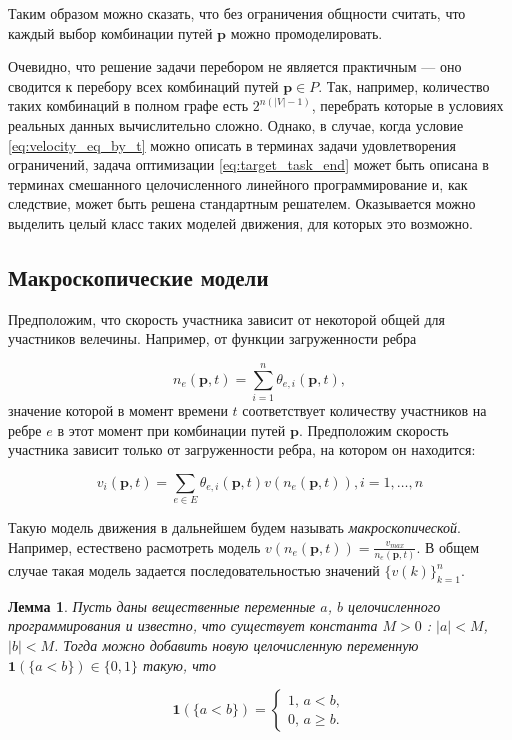 \documentclass[12pt, a4paper]{article}
\newtheorem{lemma}{Лемма}[section]
\begin{document}
Таким образом можно сказать, что без ограничения общности считать, что каждый выбор комбинации путей $\textbf{p}$ можно промоделировать.

Очевидно, что решение задачи перебором не является практичным --- оно сводится к перебору всех комбинаций путей $\textbf{p} \in P$. Так, например, количество таких комбинаций в полном графе есть $2^{n (|V| - 1)}$, перебрать которые в условиях реальных данных вычислительно сложно.
Однако, в случае, когда условие \eqref{eq:velocity_eq_by_t} можно описать в терминах задачи удовлетворения ограничений, задача оптимизации \eqref{eq:target_task_end} может быть описана в терминах смешанного целочисленного линейного программирование и, как следствие, может быть решена стандартным решателем. Оказывается можно выделить целый класс таких моделей движения, для которых это возможно.

\subsection{Макроскопические модели}

Предположим, что скорость участника зависит от некоторой общей для участников велечины. Например, от функции загруженности ребра

$$ n_{e}(\textbf{p}, t) = \sum\limits_{i = 1}^n\theta_{e, i}(\textbf{p}, t),$$
значение которой в момент времени $t$ соответствует количеству участников на ребре $e$ в этот момент при комбинации путей $\textbf{p}$. Предположим скорость участника зависит только от загруженности ребра, на котором он находится:

\begin{equation}
	\label{eq:velocity_eq_macro}
	 v_i(\textbf{p}, t) = \sum \limits _{e \in E} \theta_{e, i} (\textbf{p}, t) v (n_e (\textbf{p}, t)),  i = 1, \dots, n
\end{equation}

Такую модель движения в дальнейшем будем называть \textit{макроскопической}.
Например, естествено расмотреть модель $ v (n_e (\textbf{p}, t)) = \frac{v_{max}}{n_e (\textbf{p}, t)}$. В общем случае такая модель задается последовательностью значений  $\{v(k)\}_{k = 1}^n$.

\begin{lemma}
	\label{lemma:lt}
	Пусть даны вещественные переменные $a$, $b$ целочисленного программирования и известно, что существует константа $M > 0$ : $|a| < M$, $|b| < M$. Тогда можно добавить новую целочисленную переменную $\textbf{1} (\{a < b\}) \in \{0, 1\}$ такую, что
	
	\begin{equation*}
		\textbf{1} (\{a < b\}) = 
		\begin{cases}
			1,\, a < b,
			\\
			0,\, a \ge b.
		\end{cases}
	\end{equation*}

\end{lemma}
\end{document}
